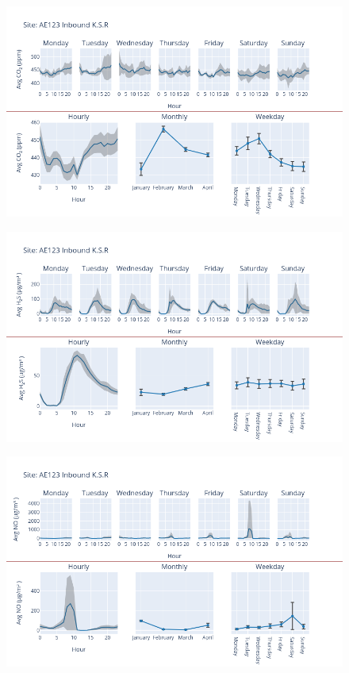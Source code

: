 \documentclass[12pt, oneside]{book}
\begin{document}
{ 
{\begin{figure}[H] 
 \centering 
\includegraphics[width=.88\textwidth, keepaspectratio]{image32} 
 \end{figure}}{} 

{\begin{figure}[H] 
 \centering 
\includegraphics[width=.88\textwidth, keepaspectratio]{image33} 
 \end{figure}}{} 

{\begin{figure}[H] 
 \centering 
\includegraphics[width=.88\textwidth, keepaspectratio]{image34} 
 \end{figure}}{} 

}
\end{document}
